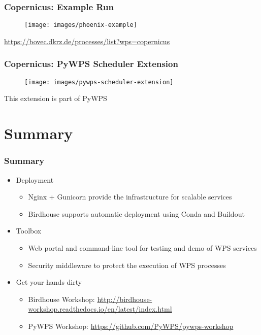 \documentclass{beamer}
\begin{document}
\begin{frame}
\frametitle<presentation>{Copernicus: Example Run}

  \begin{figure}[ht]
    \centering
    \texttt{[image: images/phoenix-example]}
  \end{figure}

  \centering
  \footnotesize{\url{https://bovec.dkrz.de/processes/list?wps=copernicus}}

\end{frame}

\begin{frame}
\frametitle<presentation>{Copernicus: PyWPS Scheduler Extension}

  \begin{figure}[ht]
    \centering
    \texttt{[image: images/pywps-scheduler-extension]}
  \end{figure}

  \centering
  \footnotesize{This extension is part of PyWPS}

\end{frame}


\section{Summary}

\begin{frame}
\frametitle<presentation>{Summary}

\begin{itemize}

  \item Deployment
  \begin{itemize}
    \item Nginx + Gunicorn provide the infrastructure for scalable services
    \item Birdhouse supports automatic deployment using Conda and Buildout
  \end{itemize}

  \item{Toolbox}
  \begin{itemize}
    \item Web portal and command-line tool for testing and demo of WPS services
    \item Security middleware to protect the execution of WPS processes
  \end{itemize}

  \item{Get your hands dirty}
  \begin{itemize}
    \item Birdhouse Workshop: \url{http://birdhouse-workshop.readthedocs.io/en/latest/index.html}
    \item PyWPS Workshop: \url{https://github.com/PyWPS/pywps-workshop}
  \end{itemize}
\end{itemize}

\end{frame}
\end{document}
